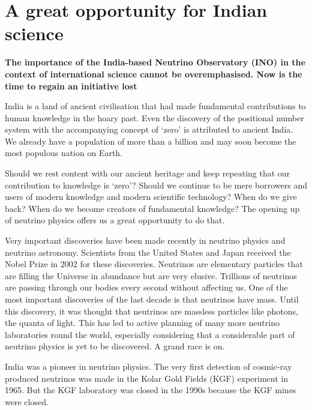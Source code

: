 \chapter[A great opportunity for Indian science]{A great opportunity for Indian science}\label{chap12}


\authinfo{}




\textbf{The importance of the India-based Neutrino Observatory (INO) in the context of international science cannot be overemphasised. Now is the time to regain an initiative lost}


India is a land of ancient civilisation that had made fundamental contributions to human knowledge in the hoary past. Even the discovery of the positional number system with the accompanying concept of ‘zero’ is attributed to ancient India. We already have a population of more than a billion and may soon become the most populous nation on Earth. 

Should we rest content with our ancient heritage and keep repeating that our contribution to knowledge is ‘zero’? Should we continue to be mere borrowers and users of modern knowledge and modern scientific technology? When do we give back? When do we become creators of fundamental knowledge? The opening up of neutrino physics offers us a great opportunity to do that.

Very important discoveries have been made recently in neutrino physics and neutrino astronomy. Scientists from the United States and Japan received the Nobel Prize in 2002 for these discoveries. Neutrinos are elementary particles that are filling the Universe in abundance but are very elusive. Trillions of neutrinos are passing through our bodies every second without affecting us. One of the most important discoveries of the last decade is that neutrinos have mass. Until this discovery, it was thought that neutrinos are massless particles like photons, the quanta of light.
This has led to active planning of many more neutrino laboratories round the world, especially considering that a considerable part of neutrino physics is yet to be discovered. A grand race is on.

India was a pioneer in neutrino physics. The very first detection of cosmic-ray produced neutrinos was made in the Kolar Gold Fields (KGF) experiment in 1965. But the KGF laboratory was closed in the 1990s because the KGF mines were closed.

